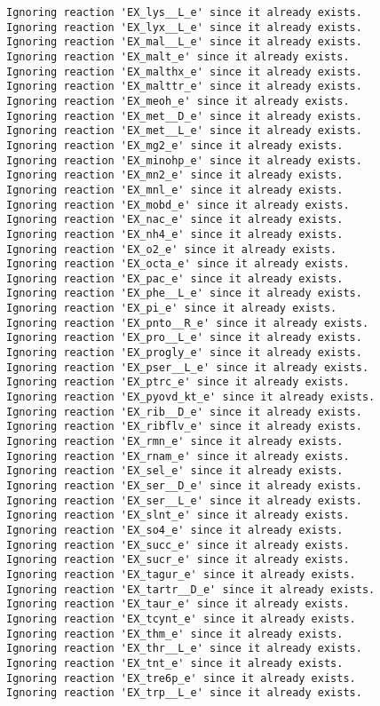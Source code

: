 \documentclass[
  letterpaper,
  DIV=11,
  numbers=noendperiod]{scrartcl}
\begin{document}
\begin{verbatim}
Ignoring reaction 'EX_lys__L_e' since it already exists.
Ignoring reaction 'EX_lyx__L_e' since it already exists.
Ignoring reaction 'EX_mal__L_e' since it already exists.
Ignoring reaction 'EX_malt_e' since it already exists.
Ignoring reaction 'EX_malthx_e' since it already exists.
Ignoring reaction 'EX_malttr_e' since it already exists.
Ignoring reaction 'EX_meoh_e' since it already exists.
Ignoring reaction 'EX_met__D_e' since it already exists.
Ignoring reaction 'EX_met__L_e' since it already exists.
Ignoring reaction 'EX_mg2_e' since it already exists.
Ignoring reaction 'EX_minohp_e' since it already exists.
Ignoring reaction 'EX_mn2_e' since it already exists.
Ignoring reaction 'EX_mnl_e' since it already exists.
Ignoring reaction 'EX_mobd_e' since it already exists.
Ignoring reaction 'EX_nac_e' since it already exists.
Ignoring reaction 'EX_nh4_e' since it already exists.
Ignoring reaction 'EX_o2_e' since it already exists.
Ignoring reaction 'EX_octa_e' since it already exists.
Ignoring reaction 'EX_pac_e' since it already exists.
Ignoring reaction 'EX_phe__L_e' since it already exists.
Ignoring reaction 'EX_pi_e' since it already exists.
Ignoring reaction 'EX_pnto__R_e' since it already exists.
Ignoring reaction 'EX_pro__L_e' since it already exists.
Ignoring reaction 'EX_progly_e' since it already exists.
Ignoring reaction 'EX_pser__L_e' since it already exists.
Ignoring reaction 'EX_ptrc_e' since it already exists.
Ignoring reaction 'EX_pyovd_kt_e' since it already exists.
Ignoring reaction 'EX_rib__D_e' since it already exists.
Ignoring reaction 'EX_ribflv_e' since it already exists.
Ignoring reaction 'EX_rmn_e' since it already exists.
Ignoring reaction 'EX_rnam_e' since it already exists.
Ignoring reaction 'EX_sel_e' since it already exists.
Ignoring reaction 'EX_ser__D_e' since it already exists.
Ignoring reaction 'EX_ser__L_e' since it already exists.
Ignoring reaction 'EX_slnt_e' since it already exists.
Ignoring reaction 'EX_so4_e' since it already exists.
Ignoring reaction 'EX_succ_e' since it already exists.
Ignoring reaction 'EX_sucr_e' since it already exists.
Ignoring reaction 'EX_tagur_e' since it already exists.
Ignoring reaction 'EX_tartr__D_e' since it already exists.
Ignoring reaction 'EX_taur_e' since it already exists.
Ignoring reaction 'EX_tcynt_e' since it already exists.
Ignoring reaction 'EX_thm_e' since it already exists.
Ignoring reaction 'EX_thr__L_e' since it already exists.
Ignoring reaction 'EX_tnt_e' since it already exists.
Ignoring reaction 'EX_tre6p_e' since it already exists.
Ignoring reaction 'EX_trp__L_e' since it already exists.

\end{verbatim}
\end{document}
